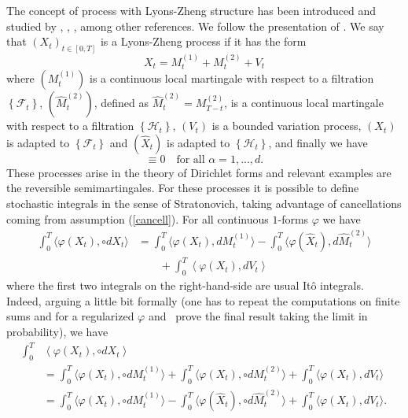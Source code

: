 \documentclass{article}
\begin{document}
The concept of process with Lyons-Zheng structure has been introduced and
studied by \cite{LZ}, \cite{LZ2}, \cite{RV}, among other references. We
follow the presentation of \cite{RV}. We say that $\left( X_{t}\right)
_{t\in \left[ 0,T\right] }$ is a Lyons-Zheng process if it has the form 
\begin{equation*}
X_{t}=M_{t}^{\left( 1\right) }+M_{t}^{\left( 2\right) }+V_{t}
\end{equation*}
where $( M_{t}^{\left( 1\right) }) $ is a continuous local
martingale with respect to a filtration $\left\{ \mathcal{F}_{t}\right\} $, $%
( \hat{M}_{t}^{\left( 2\right) }) $, defined as $\hat{M}%
_{t}^{\left( 2\right) }=M_{T-t}^{\left( 2\right) }$, is a continuous local
martingale with respect to a filtration $\left\{ \mathcal{H}_{t}\right\} $, $%
\left( V_{t}\right) $ is a bounded variation process, $\left( X_{t}\right) $
is adapted to $\left\{ \mathcal{F}_{t}\right\} $ and $( \hat{X}%
_{t}) $ is adapted to $\left\{ \mathcal{H}_{t}\right\} $, and finally
we have 
\begin{equation}
[ M^{\left( 1\right) \alpha }-M^{\left( 2\right) \alpha }] \equiv
0\quad \text{for all }\alpha =1,...,d.  \label{cancell}
\end{equation}
These processes arise in the theory of Dirichlet forms and relevant examples
are the reversible semimartingales. For these processes it is possible to
define stochastic integrals in the sense of Stratonovich, taking advantage
of cancellations coming from assumption (\ref{cancell}). 
For all continuous $1$-forms $\varphi$ we have 
\begin{equation}
\label{lyons-zheng} 
\begin{split}
\int_{0}^{T}\langle \varphi \left( X_{t}\right) ,\circ
dX_{t}\rangle  
 & = \int_{0}^{T}\langle \varphi \left( X_{t}\right) ,dM_{t}^{\left(
1\right) }\rangle -\int_{0}^{T}\langle \varphi ( \hat{X}%
_{t}) ,d\hat{M}_{t}^{\left( 2\right) }\rangle
\\ & \qquad 
+\int_{0}^{T}\left\langle \varphi \left( X_{t}\right) ,dV_{t}\right\rangle     
\end{split}
\end{equation}
where the first two integrals on the right-hand-side are usual It\^{o}
integrals. Indeed, arguing a little bit formally (one has to repeat the
computations on finite sums and for a regularized $\varphi $ and \ prove the
final result taking the limit in probability), we have 
\begin{equation*}
  \begin{split}
    \int_{0}^{T}& \left\langle \varphi \left( X_{t}\right) ,\circ
dX_{t}\right\rangle \\
&= \int_{0}^{T} \langle \varphi \left( X_{t}\right) ,\circ
dM_{t}^{\left( 1\right) } \rangle +\int_{0}^{T} \langle \varphi
\left( X_{t}\right) ,\circ dM_{t}^{\left( 2\right) } \rangle
+\int_{0}^{T} \langle \varphi \left( X_{t}\right) ,
dV_{t} \rangle \\
&= \int_{0}^{T} \langle \varphi \left( X_{t}\right) ,\circ
dM_{t}^{\left( 1\right) } \rangle -\int_{0}^{T}\langle \varphi
( \hat{X}_{t}) ,\circ d\hat{M}_{t}^{\left( 2\right)
}\rangle +\int_{0}^{T}\langle \varphi \left( X_{t}\right)
,dV_{t}\rangle .  
  \end{split}
\end{equation*}
\end{document}
